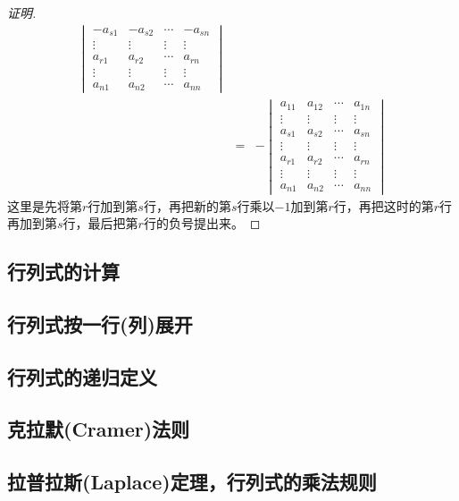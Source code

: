 \begin{proof}[证明]
\begin{eqnarray*}
\begin{vmatrix}
    -a_{s1} & -a_{s2} & \cdots & -a_{sn} \\
    \vdots & \vdots & \vdots & \vdots \\
    a_{r1} & a_{r2} & \cdots & a_{rn} \\
    \vdots & \vdots & \vdots & \vdots \\
    a_{n1} & a_{n2} & \cdots & a_{nn}
  \end{vmatrix}
    \\
    & = &
          -
  \begin{vmatrix}
    a_{11} & a_{12} & \cdots & a_{1n} \\
    \vdots & \vdots & \vdots & \vdots \\
    a_{s1} & a_{s2} & \cdots & a_{sn} \\
    \vdots & \vdots & \vdots & \vdots \\
    a_{r1} & a_{r2} & \cdots & a_{rn} \\
    \vdots & \vdots & \vdots & \vdots \\
    a_{n1} & a_{n2} & \cdots & a_{nn}
  \end{vmatrix}
  \end{eqnarray*}
  这里是先将第$r$行加到第$s$行，再把新的第$s$行乘以$-1$加到第$r$行，再把这时的第$r$行再加到第$s$行，最后把第$r$行的负号提出来。
\end{proof}

\subsection{行列式的计算}
\label{sec:computition-of-determinant}

\subsection{行列式按一行(列)展开}
\label{sec:determinant-expand-by-row-or-colume}

\subsection{行列式的递归定义}
\label{sec:recursive-definition-of-determinant}

\subsection{克拉默(Cramer)法则}
\label{sec:cramer-rule}

\subsection{拉普拉斯(Laplace)定理，行列式的乘法规则}
\label{sec:laplace-theorem-of-determinant}




